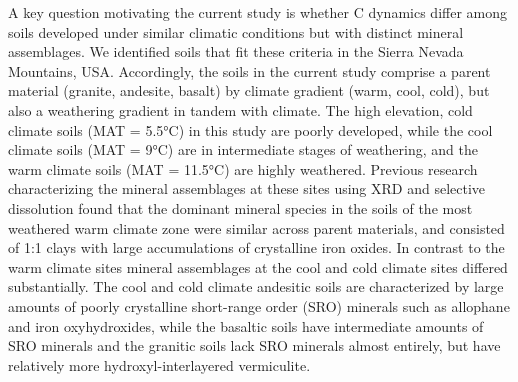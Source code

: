 \documentclass[english,man,floatsintext]{apa6}
\begin{document}
A key question motivating the current study is whether C dynamics differ among soils developed under similar climatic conditions but with distinct mineral assemblages. We identified soils that fit these criteria in the Sierra Nevada Mountains, USA. Accordingly, the soils in the current study comprise a parent material (granite, andesite, basalt) by climate gradient (warm, cool, cold), but also a weathering gradient in tandem with climate. The high elevation, cold climate soils (MAT = 5.5°C) in this study are poorly developed, while the cool climate soils (MAT = 9°C) are in intermediate stages of weathering, and the warm climate soils (MAT = 11.5°C) are highly weathered. Previous research characterizing the mineral assemblages at these sites using XRD and selective dissolution found that the dominant mineral species in the soils of the most weathered warm climate zone were similar across parent materials, and consisted of 1:1 clays with large accumulations of crystalline iron oxides. In contrast to the warm climate sites mineral assemblages at the cool and cold climate sites differed substantially. The cool and cold climate andesitic soils are characterized by large amounts of poorly crystalline short-range order (SRO) minerals such as allophane and iron oxyhydroxides, while the basaltic soils have intermediate amounts of SRO minerals and the granitic soils lack SRO minerals almost entirely, but have relatively more hydroxyl-interlayered vermiculite.
\end{document}
